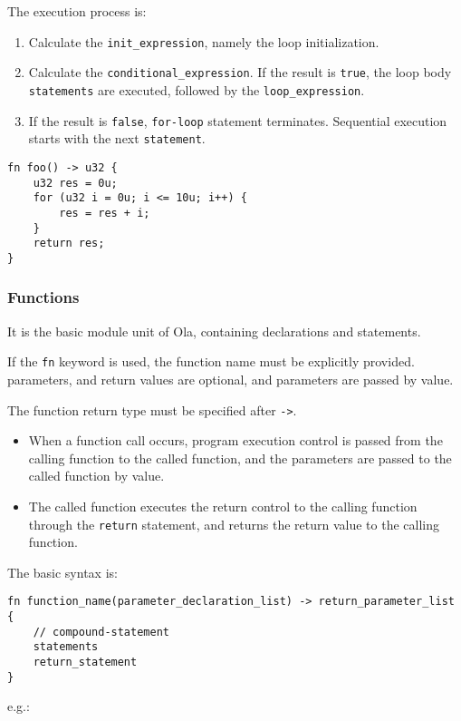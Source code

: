 The execution process is:
\begin{enumerate}
    \item Calculate the \verb|init_expression|, namely the loop initialization.
    \item Calculate the \verb|conditional_expression|. If the result is \verb|true|, the loop body \verb|statements| are executed, followed by the \verb|loop_expression|.
    \item If the result is \verb|false|, \verb|for-loop| statement terminates. Sequential execution starts with the next \verb|statement|.
\end{enumerate}

\begin{lstlisting}
fn foo() -> u32 {
    u32 res = 0u;
    for (u32 i = 0u; i <= 10u; i++) {
        res = res + i;
    }
    return res;
}
\end{lstlisting}

\subsubsection{Functions}

It is the basic module unit of Ola, containing declarations and statements.

If the \verb|fn| keyword is used, the function name must be explicitly provided. parameters, and return values are optional, and parameters are passed by value.

The function return type must be specified after \verb|->|.

\begin{itemize}
    \item When a function call occurs, program execution control is passed from the calling function to the called function, and the parameters are passed to the called function by value. 
    \item The called function executes the return control to the calling function through the \verb|return| statement, and returns the return value to the calling function.
\end{itemize}

The basic syntax is:

\begin{lstlisting}
fn function_name(parameter_declaration_list) -> return_parameter_list {
    // compound-statement
    statements
    return_statement
}
\end{lstlisting}

e.g.:

